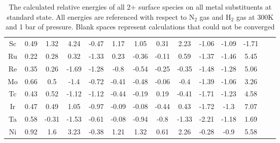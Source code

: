 \documentclass[journal=jacsat,manuscript=article]{achemso}
\begin{document}
\begin{table}
\begin{center}
\begin{tabular}{| c | c | c | c | c | c | c | c | c | c | c | c | c | c |}
Sc & 0.49 & 1.32 & 4.24 & -0.47 & 1.17 & 1.05 & 0.31 & 2.23 & -1.06 & -1.09 & -1.71 \\
Ru & 0.22 & 0.28 & 0.32 & -1.33 & 0.23 & -0.36 & -0.11 & 0.59 & -1.37 & -1.46 & 5.45 \\
Re & 0.35 & 0.26 & -1.69 & -1.28 & -0.8 & -0.54 & -0.25 & -0.35 & -1.48 & -1.28 & 5.06 \\
Mo & 0.66 & 0.5 & -1.4 & -0.72 & -0.41 & -0.48 & -0.06 & -0.4 & -1.39 & -1.06 & 3.26 \\
Tc & 0.43 & 0.52 & -1.12 & -1.12 & -0.44 & -0.19 & 0.19 & -0.41 & -1.71 & -1.23 & 4.58 \\
Ir & 0.47 & 0.49 & 1.05 & -0.97 & -0.09 & -0.08 & -0.44 & 0.43 & -1.72 & -1.3 & 7.07 \\
Ta & 0.58 & -0.31 & -1.53 & -0.61 & -0.08 & -0.94 & -0.8 & -1.33 & -2.21 & -1.18 & 1.69 \\
Ni & 0.92 & 1.6 & 3.23 & -0.38 & 1.21 & 1.32 & 0.61 & 2.26 & -0.28 & -0.9 & 5.58 \\
\hline
\end{tabular}
\end{center}
\caption{The calculated relative energies of all 2+ surface species on all metal substituents at standard state. All energies are referenced with respect to N$_2$ gas and H$_2$ gas at 300K and 1 bar of pressure. Blank spaces represent calculations that could not be converged}
\label{table:energies}
\end{table}
\end{document}
